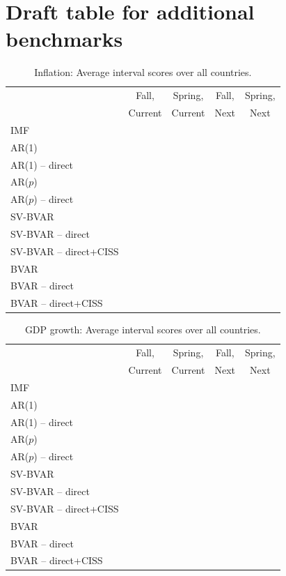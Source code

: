 \documentclass[11pt]{article}
\begin{document}
	
\section*{Draft table for additional benchmarks}
	

\begin{table}[htbp]	
\centering
\begin{tabular}{lcccc}
& Fall,&  Spring,  & 
Fall, & Spring, \\ 
& Current & Current & Next & Next \\ \toprule
IMF & & & & \\ \midrule
AR(1) & & & & \\	
AR(1) -- direct & & & & \\	
AR($p$) & & & & \\	
AR($p$) -- direct & & & & \\	
SV-BVAR & & & & \\	
SV-BVAR -- direct & & & & \\	
SV-BVAR -- direct+CISS & & & & \\	
BVAR & & & & \\	
BVAR -- direct & & & & \\	
BVAR -- direct+CISS & & & & \\\bottomrule
\end{tabular}
\caption{Inflation: Average interval scores over all countries.}
\end{table}

\begin{table}[htbp]	
	\centering
	\begin{tabular}{lcccc}
		& Fall,&  Spring,  & 
		Fall, & Spring, \\ 
		& Current & Current & Next & Next \\ \toprule
		IMF & & & & \\ \midrule
		AR(1) & & & & \\	
		AR(1) -- direct & & & & \\	
		AR($p$) & & & & \\	
		AR($p$) -- direct & & & & \\	
		SV-BVAR & & & & \\	
		SV-BVAR -- direct & & & & \\	
		SV-BVAR -- direct+CISS & & & & \\	
		BVAR & & & & \\	
		BVAR -- direct & & & & \\	
		BVAR -- direct+CISS & & & & \\\bottomrule
	\end{tabular}
	\caption{GDP growth: Average interval scores over all countries.}
\end{table}
\end{document}
